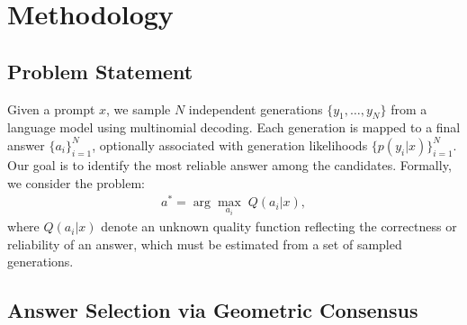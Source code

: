 \section{Methodology}\label{sec:method}


\subsection{Problem Statement}\label{sec:problem}

Given a prompt $x$, we sample $N$ independent generations $\{y_1, \dots, y_N\}$ from a language model using multinomial decoding. Each generation is mapped to a final answer $\{a_i\}_{i=1}^N$, optionally associated with generation likelihoods $\{p(y_i | x)\}_{i=1}^N$.
Our goal is to identify the most reliable answer among the candidates. Formally, we consider the problem:
\begin{align}
    a^* = \arg\max_{a_i} \; Q(a_i|x),
\end{align}
where $Q(a_i|x)$ denote an unknown quality function reflecting the correctness or reliability of an answer, which must be estimated from a set of sampled generations. 

\subsection{Answer Selection via Geometric Consensus}~\label{sec:center}

